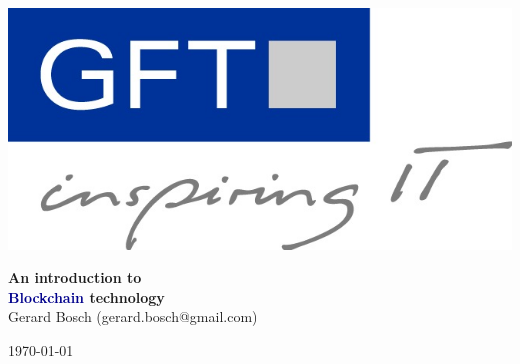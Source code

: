 \documentclass[notitlepage, usenames,dvipsnames]{beamer}
\begin{document}
    \begin{frame}
        \begin{center}
            \vspace{-4mm}\begin{center}
                             \includegraphics[scale=0.15]{../img/gft.jpg}
            \end{center}

            \vspace{1cm}
            {\huge \bfseries \textcolor{MidnightBlue!100!bg}{ An introduction to\\[3mm] \textcolor{DarkBlue}{Blockchain} technology }} \\[3mm]

            \vspace{1 cm}
            Gerard Bosch (gerard.bosch@gmail.com)

            \vspace{0.8cm}\today
        \end{center}
    \end{frame}



\end{document}
